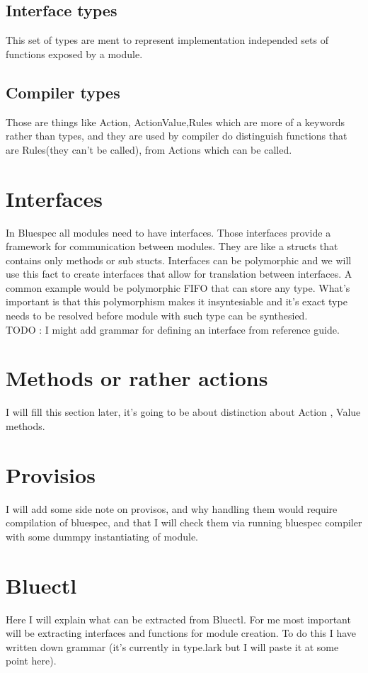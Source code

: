 \documentclass{article}
\begin{document}
    \subsection{Interface types}
        This set of types are ment to represent implementation independed sets of functions exposed by a module.
    \subsection{Compiler types}
        Those are things like Action, ActionValue,Rules which are more of a keywords rather than types, and they are used by compiler do distinguish functions that are Rules(they can't be called), from Actions which can be called.
    

\section{Interfaces}
    In Bluespec all modules need to have interfaces. Those interfaces provide a framework for communication between modules. They are like a structs that contains only methods or sub stucts. Interfaces can be polymorphic and we will use this fact to create interfaces that allow for translation between interfaces. A common example would be polymorphic FIFO that can store any type. What's important is that this polymorphism makes it insyntesiable and it's exact type needs to be resolved before module with such type can be synthesied.
    \\
    TODO : I might add grammar for defining an interface from reference guide.  
    
\section{Methods or rather actions}
    I will fill this section later, it's going to be about distinction about Action , Value methods.
\section{Provisios}
    I will add some side note on provisos, and why handling them would require compilation of bluespec, and that I will check them via running bluespec compiler with some dummpy instantiating of module.
    
\section{Bluectl}
    Here I will explain what can be extracted from Bluectl.
    For me most important will be extracting interfaces and functions for module creation.
    To do this I have written down grammar (it's currently in type.lark but I will paste it at some point here).
    
\end{document}
